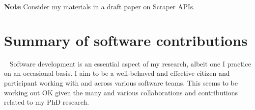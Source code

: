 \textbf{Note} Consider my materials in a draft paper on Scraper APIs.

\section{Summary of software contributions}~\label{sec:summary-of-software-contributions}
Software development is an essential aspect of my research, albeit one I practice on an occasional basis. I aim to be a well-behaved and effective citizen and participant working with and across various software teams. This seems to be working out OK given the many and various collaborations and contributions related to my PhD research.
